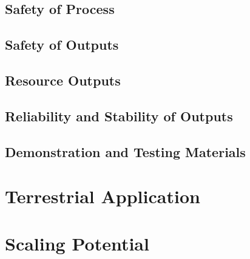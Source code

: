 \documentclass{report}
\begin{document}

\subsection{Safety of Process}

\subsection{Safety of Outputs}

\subsection{Resource Outputs}

\subsection{Reliability and Stability of Outputs}





\subsection{Demonstration and Testing Materials}

\section{Terrestrial Application}

\section{Scaling Potential}

\newpage



\end{document}
